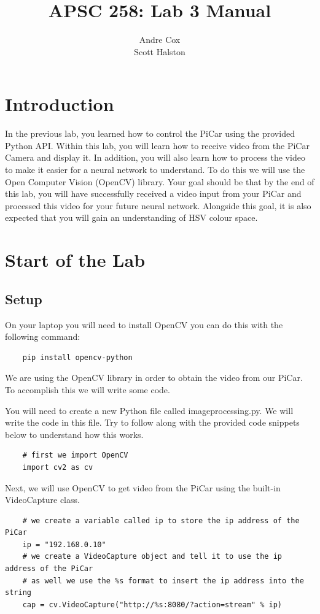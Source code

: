 \documentclass[11pt]{report}
\title{APSC 258: Lab 3 Manual}
\author{Andre Cox \\ Scott Halston}
\begin{document}
\maketitle
\tableofcontents

\clearpage

\chapter{Introduction}
In the previous lab, you learned how to control the PiCar using the provided Python API. Within this lab, you will learn how to receive video from the PiCar Camera and display it. In addition, you will also learn how to process the video to make it easier for a neural network to understand. To do this we will use the Open Computer Vision (OpenCV) library. 
Your goal should be that by the end of this lab, you will have successfully received a video input from your PiCar and processed this video for your future neural network. Alongside this goal, it is also expected that you will gain an understanding of HSV colour space.

\chapter{Start of the Lab}
\section{Setup}
On your laptop you will need to install OpenCV you can do this with the following command:
\begin{verbatim}
    pip install opencv-python  
\end{verbatim}

We are using the OpenCV library in order to obtain the video from our PiCar.  To accomplish this we will write some code.

You will need to create a new Python file called imageprocessing.py. We will write the code in this file.
Try to follow along with the provided code snippets below to understand how this works. 

\begin{verbatim}
    # first we import OpenCV 
    import cv2 as cv 
\end{verbatim}

Next, we will use OpenCV to get video from the PiCar using the built-in VideoCapture class.
\begin{verbatim}
    # we create a variable called ip to store the ip address of the PiCar
    ip = "192.168.0.10"
    # we create a VideoCapture object and tell it to use the ip address of the PiCar
    # as well we use the %s format to insert the ip address into the string
    cap = cv.VideoCapture("http://%s:8080/?action=stream" % ip)
\end{verbatim}
\end{document}
